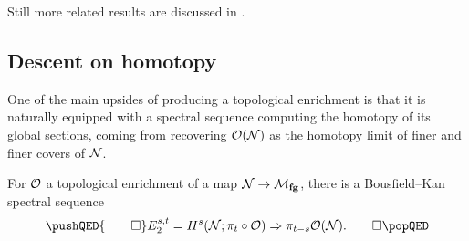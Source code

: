 \begin{remark}
Still more related results are discussed in .
\end{remark}




\subsection*{Descent on homotopy}

One of the main upsides of producing a topological enrichment is that it is naturally equipped with a spectral sequence computing the homotopy of its global sections, coming from recovering \(\mathcal{O}(\mathcal{N})\) as the homotopy limit of finer and finer covers of \(\mathcal{N}\).

\begin{lemma}
For \(\mathcal{O}\) a topological enrichment of a map \(\mathcal{N} \to \mathcal{M}_{\mathbf{fg}}\), there is a Bousfield--Kan spectral sequence \[\pushQED{\qed} E_2^{s, t} = H^s(\stack{N}; \pi_t \circ \sheaf O) \Rightarrow \pi_{t-s} \sheaf{O}(\stack{N}). \qedhere \popQED\]
\end{lemma}

